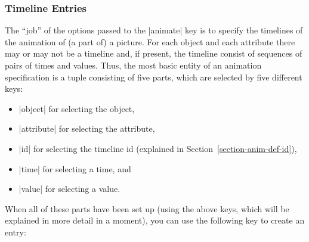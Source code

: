 \subsubsection{Timeline Entries}

The ``job'' of the options passed to the |animate| key is to specify
the timelines of the animation of (a part of) a picture. For each
object and each attribute there may or may not be a timeline and, if
present, the timeline consist of sequences of pairs of times and
values. Thus, the most basic entity of an animation specification is a
tuple consisting of five parts, which are selected by five different
keys: 
\begin{itemize}
\item |object| for selecting the object,
\item |attribute| for selecting the attribute,
\item |id| for selecting the timeline id (explained in
  Section~\ref{section-anim-def-id}),
\item |time| for selecting a time, and
\item |value| for selecting a value.
\end{itemize}
When all of these parts have been set up (using the above keys, which
will be explained in more detail in a moment), you can use the
following key to create an entry:

